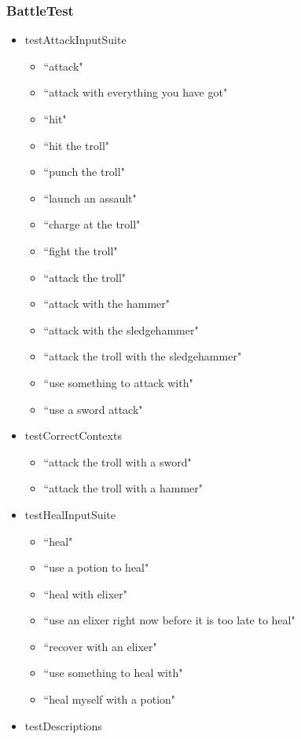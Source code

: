 \documentclass[11pt]{article}
\begin{document}
\begin{appendices}
\subsubsection{BattleTest}
\begin{scriptsize}
\begin{itemize}
\item testAttackInputSuite
	\begin{itemize}
	\item ``attack"
	\item ``attack with everything you have got"
	\item ``hit"
	\item ``hit the troll"
	\item ``punch the troll"
	\item ``launch an assault"
	\item ``charge at the troll"
	\item ``fight the troll"
	\item ``attack the troll"
	\item ``attack with the hammer"
	\item ``attack with the sledgehammer"
	\item ``attack the troll with the sledgehammer"
	\item ``use something to attack with"
	\item ``use a sword attack"
	\end{itemize}
\item testCorrectContexts
	\begin{itemize}
	\item ``attack the troll with a sword"
	\item ``attack the troll with a hammer"
	\end{itemize}
\item testHealInputSuite
	\begin{itemize}
	\item ``heal"
	\item ``use a potion to heal"
	\item ``heal with elixer"
	\item ``use an elixer right now before it is too late to heal"
	\item ``recover with an elixer"
	\item ``use something to heal with"
	\item ``heal myself with a potion"
	\end{itemize}
\item testDescriptions
	\begin{itemize}

\end{itemize}
\end{itemize}
\end{scriptsize}
\end{appendices}
\end{document}

